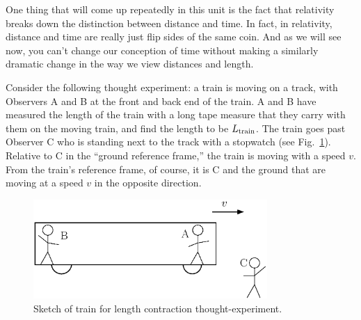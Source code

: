 One thing that will come up repeatedly in this unit is the fact that
relativity breaks down the distinction between distance and time.  In
fact, in relativity, distance and time are really just flip sides of
the same coin.  And as we will see now, you can't change our
conception of time without making a similarly dramatic change in the
way we view distances and length.
   
Consider the following thought experiment: a train is moving on a
track, with Observers A and B at the front and back end of the train.
A and B have measured the length of the train with a long tape measure
that they carry with them on the moving train, and find the length to
be $L_{\rm train}$.  The train goes past Observer C who is standing
next to the track with a stopwatch (see Fig.~\ref{fig:contraction}).
Relative to C in the ``ground reference frame,'' the train is moving
with a speed $v$.  From the train's reference frame, of course, it is
C and the ground that are moving at a speed $v$ in the opposite
direction.
    
   
\begin{figure}[tbp]
\begin{center}
\includegraphics[width=3.5in]{basic_postulates_of_relativity/rel1_train.eps}
\end{center}
\caption{Sketch of train for length contraction thought-experiment.}
\label{fig:contraction}
\end{figure}   
   
